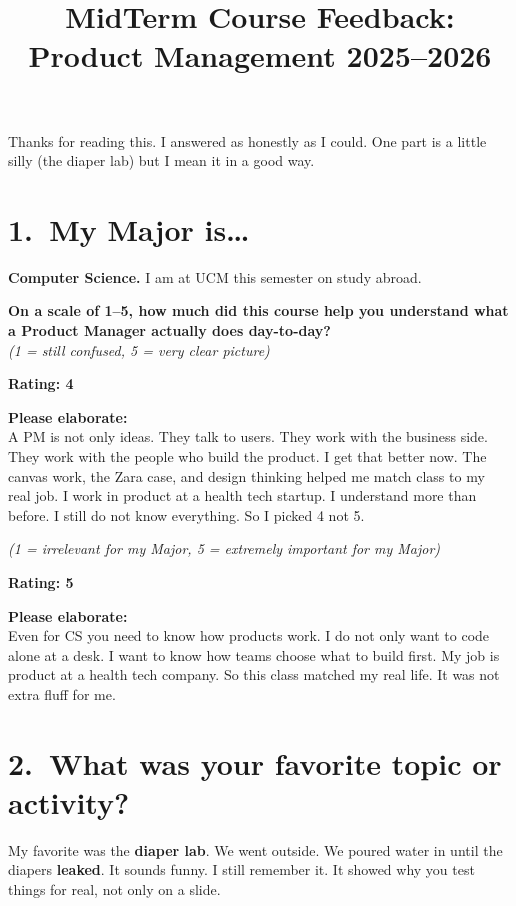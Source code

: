 \documentclass[11pt,a4paper]{article}
\title{MidTerm Course Feedback: Product Management 2025--2026}
\author{}
\date{}
\begin{document}
\maketitle

\noindent Thanks for reading this. I answered as honestly as I could. One part is a little silly (the diaper lab) but I mean it in a good way.

\section*{1.\ My Major is\ldots}

\textbf{Computer Science.} I am at UCM this semester on study abroad.

\medskip
\noindent\textbf{On a scale of 1--5, how much did this course help you understand what a Product Manager actually does day-to-day?}\\
\textit{(1 = still confused, 5 = very clear picture)}

\medskip
\noindent\textbf{Rating: 4}

\medskip
\noindent\textbf{Please elaborate:}\\
A PM is not only ideas. They talk to users. They work with the business side. They work with the people who build the product. I get that better now. The canvas work, the Zara case, and design thinking helped me match class to my real job. I work in product at a health tech startup. I understand more than before. I still do not know everything. So I picked 4 not 5.

\medskip
\noindent\textit{(1 = irrelevant for my Major, 5 = extremely important for my Major)}

\medskip
\noindent\textbf{Rating: 5}

\medskip
\noindent\textbf{Please elaborate:}\\
Even for CS you need to know how products work. I do not only want to code alone at a desk. I want to know how teams choose what to build first. My job is product at a health tech company. So this class matched my real life. It was not extra fluff for me.

\section*{2.\ What was your favorite topic or activity?}

My favorite was the \textbf{diaper lab}. We went outside. We poured water in until the diapers \textbf{leaked}. It sounds funny. I still remember it. It showed why you test things for real, not only on a slide.
\end{document}
